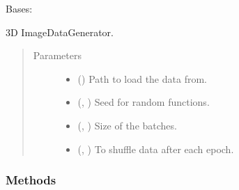 \documentclass[letterpaper,10pt,english]{sphinxmanual}
\begin{document}
\begin{fulllineitems}
\label{\detokenize{data/generators/simple_generator:data.generators.simple_data_generators.simple_3D_data_generator}}
Bases: 

3D ImageDataGenerator.
\begin{quote}\begin{description}
\item[{Parameters}] \leavevmode\begin{itemize}
\item {} 
 () \textendash{} Path to load the data from.

\item {} 
 (, ) \textendash{} Seed for random functions.

\item {} 
 (, ) \textendash{} Size of the batches.

\item {} 
 (, ) \textendash{} To shuffle data after each epoch.

\end{itemize}

\end{description}\end{quote}
\subsubsection*{Methods}


\begin{savenotes}\sphinxatlongtablestart\begin{longtable}[c]{}
\hline


\end{longtable}
\end{savenotes}
\end{fulllineitems}
\end{document}
